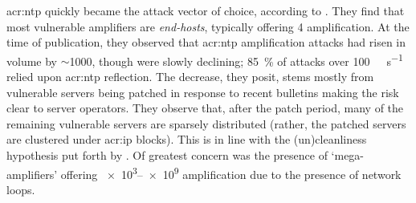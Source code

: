\gls{acr:ntp} quickly became the attack vector of choice, according to \Textcite{DBLP:conf/imc/CzyzKGPBK14}.
They find that most vulnerable amplifiers are \emph{end-hosts}, typically offering \qty{4}{\times} amplification.
At the time of publication, they observed that \gls{acr:ntp} amplification attacks had risen in volume by $\sim$\qty{1000}{\times}, though were slowly declining; \qty{85}{\percent} of attacks over \qty{100}{\giga\bit\per\second} relied upon \gls{acr:ntp} reflection.
The decrease, they posit, stems mostly from vulnerable servers being patched in response to recent bulletins making the risk clear to server operators.
They observe that, after the patch period, many of the remaining vulnerable servers are sparsely distributed (rather, the patched servers are clustered under \gls{acr:ip} blocks).
This is in line with the (un)cleanliness hypothesis put forth by \textcite{DBLP:conf/imc/CollinsSFJWSK07}.
Of greatest concern was the presence of `mega-amplifiers' offering \qtyrange{e3}{e9}{\times} amplification due to the presence of network loops.



